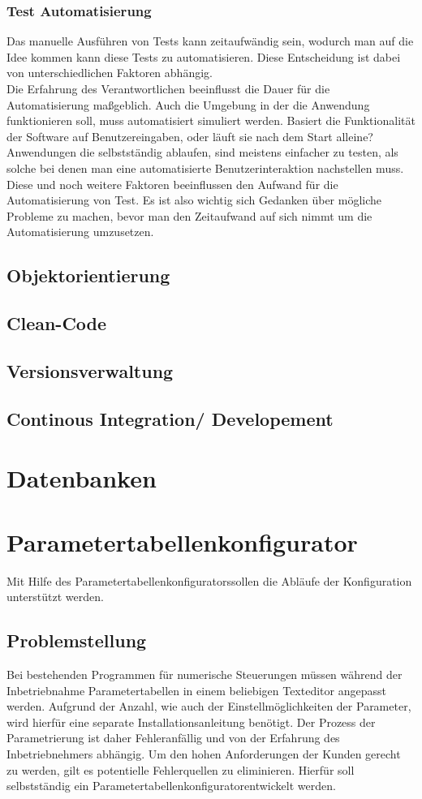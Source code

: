 \documentclass[12pt,a4paper]{article}
\begin{document}
\subsubsection{Test Automatisierung}
Das manuelle Ausführen von Tests kann zeitaufwändig sein, wodurch man auf die Idee kommen kann diese Tests zu automatisieren. Diese Entscheidung ist dabei von unterschiedlichen Faktoren abhängig. \\
Die Erfahrung des Verantwortlichen beeinflusst die Dauer für die Automatisierung maßgeblich. Auch die Umgebung in der die Anwendung funktionieren soll, muss automatisiert simuliert werden. Basiert die Funktionalität der Software auf Benutzereingaben, oder läuft sie nach dem Start alleine? Anwendungen die selbstständig ablaufen, sind meistens einfacher zu testen, als solche bei denen man eine automatisierte Benutzerinteraktion nachstellen muss\cite{fewster1999software}. \\
Diese und noch weitere Faktoren beeinflussen den Aufwand für die Automatisierung von Test. Es ist also wichtig sich Gedanken über mögliche Probleme zu machen, bevor man den Zeitaufwand auf sich nimmt um die Automatisierung umzusetzen. 
\subsection{Objektorientierung}
\label{Objektorientierung}
\subsection{Clean-Code}
\label{CC}
\subsection{Versionsverwaltung}
\label{Git}
\subsection{Continous Integration/ Developement}
\label{CI}
\section{Datenbanken}
\label{Db}
\section{Parametertabellenkonfigurator}
Mit Hilfe des \glqq Parametertabellenkonfigurators\grqq\space sollen die Abläufe der Konfiguration unterstützt werden.
\subsection{Problemstellung}
Bei bestehenden Programmen für numerische Steuerungen müssen während der Inbetriebnahme Parametertabellen in einem beliebigen Texteditor angepasst werden. Aufgrund der Anzahl, wie auch der Einstellmöglichkeiten der Parameter, wird hierfür eine separate Installationsanleitung benötigt. Der Prozess der Parametrierung ist daher Fehleranfällig und von der Erfahrung des Inbetriebnehmers abhängig. Um den hohen Anforderungen der Kunden gerecht zu werden, gilt es potentielle Fehlerquellen zu eliminieren. Hierfür soll selbstständig ein \glqq Parametertabellenkonfigurator\grqq\space entwickelt werden.
\end{document}
